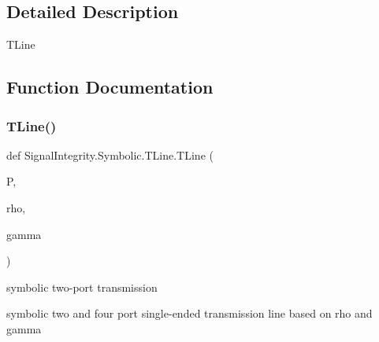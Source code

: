 \subsection{Detailed Description}
\begin{DoxyVerb}TLine\end{DoxyVerb}
 

\subsection{Function Documentation}
\mbox{\label{namespaceSignalIntegrity_1_1Symbolic_1_1TLine_ab6b9daac20a1c798e782aa9af3a6e44f}} 
\subsubsection{\texorpdfstring{T\+Line()}{TLine()}}
{\footnotesize\ttfamily def Signal\+Integrity.\+Symbolic.\+T\+Line.\+T\+Line (\begin{DoxyParamCaption}\item[{}]{P,  }\item[{}]{rho,  }\item[{}]{gamma }\end{DoxyParamCaption})}



symbolic two-\/port transmission 

symbolic two and four port single-\/ended transmission line based on rho and gamma


